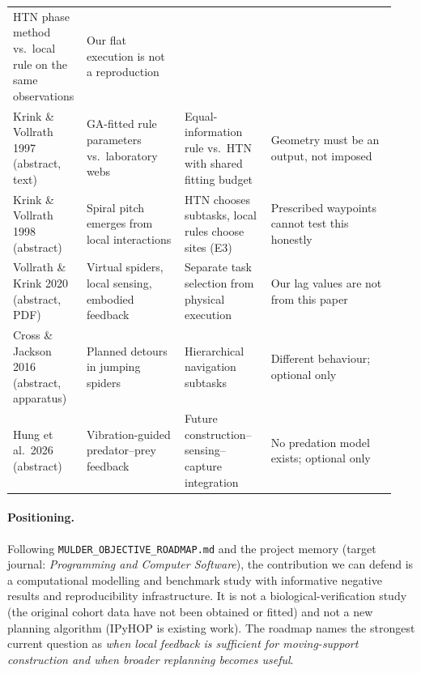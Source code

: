 {\begin{longtable}{@{}p{0.15\linewidth}p{0.25\linewidth}p{0.22\linewidth}p{0.32\linewidth}@{}}
  HTN phase method vs.\ local rule on the same observations & Our flat execution is not a reproduction \\
Krink \& Vollrath 1997~\cite{krink1997analysing} (abstract, text) & GA-fitted rule parameters vs.\ laboratory
  webs & Equal-information rule vs.\ HTN with shared fitting budget & Geometry must be an output, not imposed \\
Krink \& Vollrath 1998~\cite{krink1998emergent} (abstract) & Spiral pitch emerges from local interactions &
  HTN chooses subtasks, local rules choose sites (E3) & Prescribed waypoints cannot test this honestly \\
Vollrath \& Krink 2020~\cite{vollrath2020robotics} (abstract, PDF) & Virtual spiders, local sensing, embodied
  feedback & Separate task selection from physical execution & Our lag values are not from this paper \\
Cross \& Jackson 2016~\cite{cross2016detours} (abstract, apparatus) & Planned detours in jumping spiders &
  Hierarchical navigation subtasks & Different behaviour; optional only \\
Hung et al.\ 2026~\cite{hung2026feedback} (abstract) & Vibration-guided predator--prey feedback & Future
  construction--sensing--capture integration & No predation model exists; optional only \\
\end{longtable}
}

\paragraph{Positioning.}
Following \texttt{MULDER\_\allowbreak{}OBJECTIVE\_\allowbreak{}ROADMAP.md} and the project memory (target journal: \emph{Programming and
Computer Software}), the contribution we can defend is a computational modelling and benchmark study with
informative negative results and reproducibility infrastructure. It is not a biological-verification study
(the original cohort data have not been obtained or fitted) and not a new planning algorithm (IPyHOP is
existing work). The roadmap names the strongest current question as \emph{when local feedback is sufficient
for moving-support construction and when broader replanning becomes useful}.
